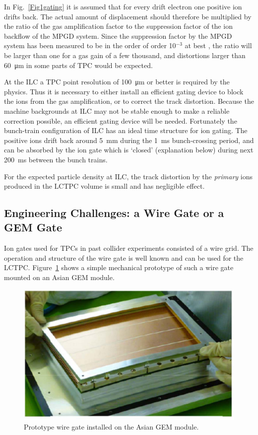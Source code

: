 In  Fig.~\ref{Fig1gating} it is assumed that for every drift electron one positive ion drifts back.
The actual amount of displacement should therefore be multiplied by the ratio of the gas amplification
factor to the suppression factor of the ion backflow of the MPGD system. Since the suppression factor by the
MPGD system has been measured to be in the order of order 10$^{-3}$ at
best \cite{Fujii_IonEffects}, the ratio will be larger than one for a gas gain of a few thousand, and distortions larger
than \SI{60}{\micro m} in some parts of TPC would be expected.

At the ILC a TPC point resolution of \SI{100}{\micro m} or better is required by the physics. Thus it is
necessary to either install an efficient gating device to block the ions from the gas amplification, or to correct
the track distortion. Because the machine backgrounds at ILC may not be stable enough to make a reliable
correction possible, an efficient gating device will be needed. Fortunately the bunch-train configuration of ILC
has an ideal time structure for ion gating. The positive ions drift back around \SI{5}{mm} during
the \SI{1}{ms} bunch-crossing period, and can be absorbed by the ion gate which is `closed' (explanation
below) during next \SI{200}{ms} between the bunch trains.

For the expected particle density at ILC, the track distortion by the
{\em{primary}} ions produced in the LCTPC volume is small and has negligible effect.

\subsection{Engineering Challenges: a Wire Gate or a GEM Gate}

Ion gates used for TPCs in past collider experiments consisted of a wire grid. The operation and
structure of the wire gate is well known and can be used for the LCTPC. Figure~\ref{Fig2gating} shows
a simple mechanical prototype of such a wire gate mounted on an Asian GEM module.

\begin{figure}
\begin{center}
\includegraphics[width=.7\textwidth]{Tracker/TPC_Bonn/plots/TPC-Gate_Fig2gating.pdf}%
\caption{\label{Fig2gating} {Prototype wire gate installed on the Asian GEM module.}}
\end{center}
\end{figure}

